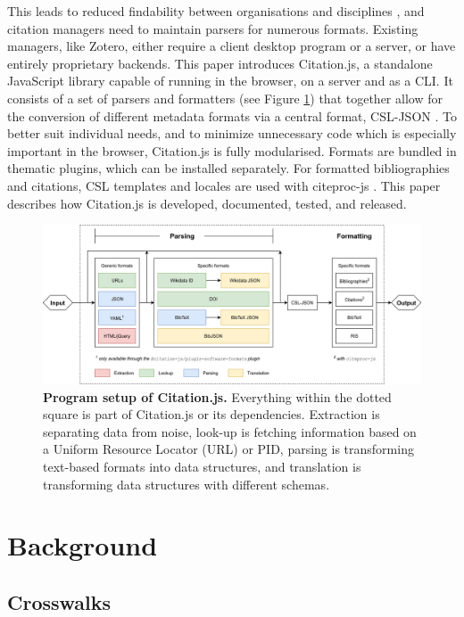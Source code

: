 \documentclass[fleqn,10pt,lineno]{wlpeerj} %
\begin{document}
This leads to reduced findability between organisations and disciplines \citep{godby_repository_2004,zinn_crosswalking_2016}, and citation managers need to maintain parsers for numerous formats. Existing managers, like Zotero, either require a client desktop program or a server, or have entirely proprietary backends. This paper introduces Citation.js, a standalone JavaScript library capable of running in the browser, on a server and as a CLI. It consists of a set of parsers and formatters (see Figure \ref{fig:structure}) that together allow for the conversion of different metadata formats via a central format, CSL-JSON \citep{Bennett2018Juris-M/citeproc-js}. To better suit individual needs, and to minimize unnecessary code which is especially important in the browser, Citation.js is fully modularised. Formats are bundled in thematic plugins, which can be installed separately. For formatted bibliographies and citations, CSL templates and locales are used with citeproc-js \citep{zelle_csl_2012,Bennett2018Juris-M/citeproc-js}. This paper describes how Citation.js is developed, documented, tested, and released.

\begin{figure}[bt]
\centering
\includegraphics[width=\linewidth]{figures/Figure_1.png}
\caption{\textbf{Program setup of Citation.js.} Everything within the dotted square is part of Citation.js or its dependencies. Extraction is separating data from noise, look-up is fetching information based on a Uniform Resource Locator (URL) or PID, parsing is transforming text-based formats into data structures, and translation is transforming data structures with different schemas.}
\label{fig:structure}
\end{figure}

\section*{Background}

\subsection*{Crosswalks}
\end{document}
